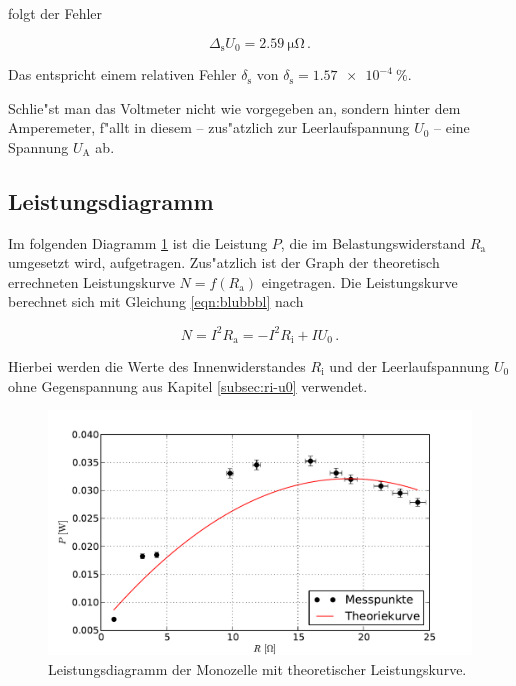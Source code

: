 		folgt der Fehler

		\begin{equation*}
			\Delta_\mathrm{s} U_0 = \SI{2.59}{\micro \ohm} \,.
		\end{equation*}

		Das entspricht einem relativen Fehler $\delta_\mathrm{s}$ von $\delta_\mathrm{s} = \SI{1.57e-4}{\percent}$.

		Schlie"st man das Voltmeter nicht wie vorgegeben an, sondern hinter dem Amperemeter, f"allt in diesem -- zus"atzlich zur Leerlaufspannung $U_0$ -- eine Spannung $U_\mathrm{A}$ ab.

	\subsection{Leistungsdiagramm}
	\label{subsec:leistung}
		Im folgenden Diagramm \ref{fig:graph_monozelle_leistung} ist die Leistung $P$, die im Belastungswiderstand $R_\mathrm{a}$ umgesetzt wird, aufgetragen.
		Zus"atzlich ist der Graph der theoretisch errechneten Leistungskurve $N = f(R_\mathrm{a})$ eingetragen.
		Die Leistungskurve berechnet sich mit Gleichung \eqref{eqn:blubbbl} nach

		\begin{equation*}
			N = I^2 R_\mathrm{a} = - I^2 R_\mathrm{i} + I U_0 \,.
		\end{equation*}

		Hierbei werden die Werte des Innenwiderstandes $R_\mathrm{i}$ und der Leerlaufspannung $U_0$ ohne Gegenspannung aus Kapitel \ref{subsec:ri-u0} verwendet.

		\begin{figure}[h]
			\centering
			\includegraphics[width = 15cm]{img/graph_monozelle_leistung.pdf}
			\caption{Leistungsdiagramm der Monozelle mit theoretischer Leistungskurve. \label{fig:graph_monozelle_leistung}}
		\end{figure}